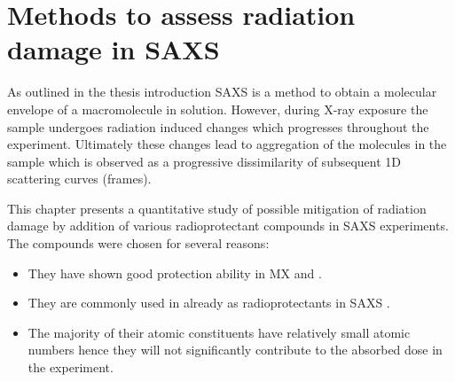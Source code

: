 \chapter{Methods to assess radiation damage in SAXS}
\label{chap:Methods to assess radiation damage in SAXS}

 As outlined in the thesis introduction SAXS is a method to obtain a molecular envelope of a macromolecule in solution.
 However, during X-ray exposure the sample undergoes radiation induced changes which progresses throughout the experiment.
 Ultimately these changes lead to aggregation of the molecules in the sample which is observed as a progressive dissimilarity of subsequent 1D scattering curves (frames).

 This chapter presents a quantitative study of possible mitigation of radiation damage by addition of various radioprotectant compounds in SAXS experiments. The compounds were chosen for several reasons:
 \begin{itemize}
     \item They have shown good protection ability in MX \cite{allan2012} and \cite{southworth2007radioprotectant}.
     \item They are commonly used in already as radioprotectants in SAXS \cite{grishaev2012sample}.
     \item The majority of their atomic constituents have relatively small atomic numbers hence they will not significantly contribute to the absorbed dose in the experiment.
 \end{itemize}
